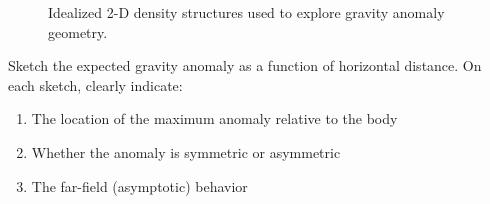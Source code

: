 \documentclass[11pt,a4paper,final]{article}
\begin{document}
\begin{figure}[ht]
\begin{minipage}[t]{0.48\textwidth}
\end{minipage}

\caption{Idealized 2-D density structures used to explore gravity anomaly geometry.}
\end{figure}

Sketch the expected gravity anomaly as a function of horizontal distance.
On each sketch, clearly indicate:
\begin{enumerate}
    \item The location of the maximum anomaly relative to the body
    \item Whether the anomaly is symmetric or asymmetric
    \item The far-field (asymptotic) behavior
\end{enumerate}
\end{document}
